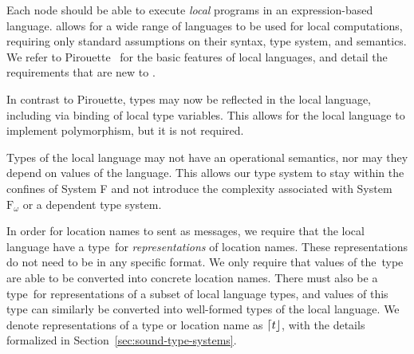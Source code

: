 Each node should be able to execute \emph{local} programs in an expression-based language.
\langname allows for a wide range of languages to be used for local computations, requiring only standard assumptions on their syntax, type system, and semantics.
We refer to Pirouette~\citep{HirschG22} for the basic features of local languages, and detail the requirements that are new to \langname.



In contrast to Pirouette, types may now be reflected in the local language, including via binding of local type variables.
This allows for the local language to implement polymorphism, but it is not required.

Types of the local language may not have an operational semantics, nor may they depend on values of the language.
This allows our type system to stay within the confines of System F and not introduce the complexity associated with System $\text{F}_{\omega}$ or a dependent type system.

In order for location names to sent as messages, we require that the local language have a type~\Loc for \emph{representations} of location names.
These representations do not need to be in any specific format.
We only require that values of the~\Loc type are able to be converted into concrete location names.
There must also be a type~\Typ for representations of a subset of local language types, and values of this type can similarly be converted into well-formed types of the local language.
We denote representations of a type or location name as $\lceil t\rfloor$, with the details formalized in Section~\ref{sec:sound-type-systems}.

